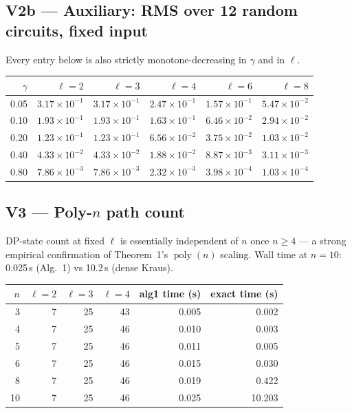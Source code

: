 \documentclass[11pt]{article}
\begin{document}
\subsection{V2b --- Auxiliary: RMS over 12 random circuits, fixed input}
Every entry below is also strictly monotone-decreasing in $\gamma$ and in $\ell$.

\begin{center}
\begin{tabular}{r|rrrrr}
\toprule
$\gamma$ & $\ell{=}2$ & $\ell{=}3$ & $\ell{=}4$ & $\ell{=}6$ & $\ell{=}8$ \\
\midrule
0.05 & $3.17{\times}10^{-1}$ & $3.17{\times}10^{-1}$ & $2.47{\times}10^{-1}$ & $1.57{\times}10^{-1}$ & $5.47{\times}10^{-2}$ \\
0.10 & $1.93{\times}10^{-1}$ & $1.93{\times}10^{-1}$ & $1.63{\times}10^{-1}$ & $6.46{\times}10^{-2}$ & $2.94{\times}10^{-2}$ \\
0.20 & $1.23{\times}10^{-1}$ & $1.23{\times}10^{-1}$ & $6.56{\times}10^{-2}$ & $3.75{\times}10^{-2}$ & $1.03{\times}10^{-2}$ \\
0.40 & $4.33{\times}10^{-2}$ & $4.33{\times}10^{-2}$ & $1.88{\times}10^{-2}$ & $8.87{\times}10^{-3}$ & $3.11{\times}10^{-3}$ \\
0.80 & $7.86{\times}10^{-3}$ & $7.86{\times}10^{-3}$ & $2.32{\times}10^{-3}$ & $3.98{\times}10^{-4}$ & $1.03{\times}10^{-4}$ \\
\bottomrule
\end{tabular}
\end{center}

\subsection{V3 --- Poly-$n$ path count}
DP-state count at fixed $\ell$ is essentially independent of $n$ once $n{\ge}4$
--- a strong empirical confirmation of Theorem~1's $\operatorname{poly}(n)$ scaling.
Wall time at $n{=}10$: 0.025\,s (Alg.~1) vs 10.2\,s (dense Kraus).

\begin{center}
\begin{tabular}{r|rrr|rr}
\toprule
$n$ & $\ell{=}2$ & $\ell{=}3$ & $\ell{=}4$ & alg1 time (s) & exact time (s) \\
\midrule
3  & 7 & 25 & 43 & 0.005 & 0.002  \\
4  & 7 & 25 & 46 & 0.010 & 0.003  \\
5  & 7 & 25 & 46 & 0.011 & 0.005  \\
6  & 7 & 25 & 46 & 0.015 & 0.030  \\
8  & 7 & 25 & 46 & 0.019 & 0.422  \\
10 & 7 & 25 & 46 & 0.025 & 10.203 \\
\bottomrule
\end{tabular}
\end{center}
\end{document}
